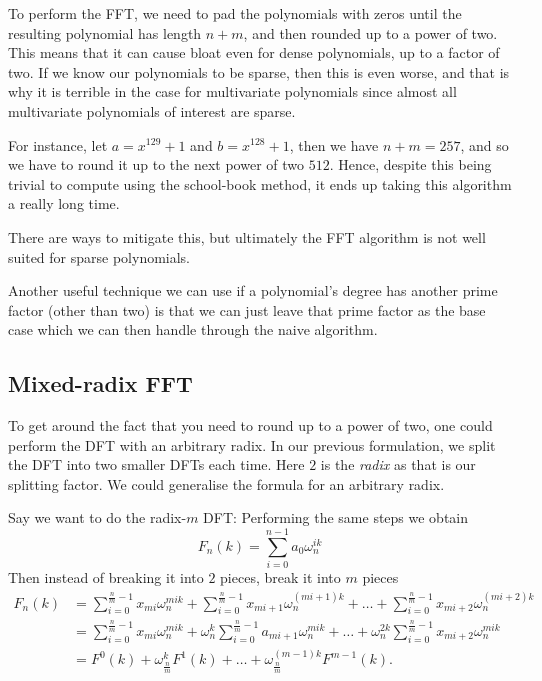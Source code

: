 \begin{remark}
    To perform the FFT, we need to pad the polynomials with zeros until the resulting polynomial has length $n + m$, and then rounded up to a power of two. This means that it can cause bloat even for dense polynomials, up to a factor of two. If we know our polynomials to be sparse, then this is even worse, and that is why it is terrible in the case for multivariate polynomials since almost all multivariate polynomials of interest are sparse.

    For instance, let $a = x^{129} + 1$ and $b = x^{128} + 1$, then we have $n + m = 257$, and so we have to round it up to the next power of two $512$. Hence, despite this being trivial to compute using the school-book method, it ends up taking this algorithm a really long time.

    There are ways to mitigate this, but ultimately the FFT algorithm is not well suited for sparse polynomials.

    Another useful technique we can use if a polynomial's degree has another prime factor (other than two) is that we can just leave that prime factor as the base case which we can then handle through the naive algorithm.
\end{remark}

\subsection{Mixed-radix FFT}

To get around the fact that you need to round up to a power of two, one could perform the DFT with an arbitrary radix. In our previous formulation, we split the DFT into two smaller DFTs each time. Here $2$ is the \emph{radix} as that is our splitting factor. We could generalise the formula for an arbitrary radix.

Say we want to do the radix-$m$ DFT:
Performing the same steps we obtain
\[
    F_n(k) = \sum^{n-1}_{i=0} a_0\omega_n^{ik}
\]
Then instead of breaking it into $2$ pieces, break it into $m$ pieces
\begin{align*}
    F_n(k) &= \sum^{\frac{n}{m}-1}_{i=0} x_{mi}\omega_n^{mik} + \sum^{\frac{n}{m}-1}_{i=0} x_{mi+1}\omega_n^{(mi+1)k} + \ldots + \sum^{\frac{n}{m}-1}_{i=0} x_{mi+2}\omega_n^{(mi+2)k}\\
          &= \sum^{\frac{n}{m}-1}_{i=0} x_{mi}\omega_n^{mik} + \omega_n^k\sum^{\frac{n}{m}-1}_{i=0} a_{mi+1}\omega_n^{mik} + \ldots +  \omega_n^{2k}\sum^{\frac{n}{m}-1}_{i=0} x_{mi+2}\omega_n^{mik}\\
          &= F^0(k) + \omega_{\frac{n}{m}}^k F^1(k) + \ldots + \omega_{\frac{n}{m}}^{(m-1)k} F^{m-1}(k).
\end{align*}


